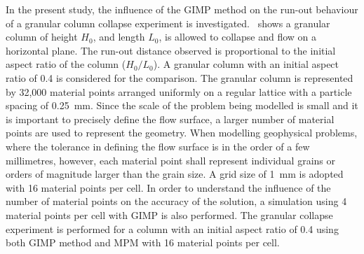 In the present study, the influence of the GIMP method on the run-out behaviour 
of a granular column collapse experiment is investigated.~ shows 
a granular column of height $H_0$, and length $L_0$, is allowed to collapse 
and flow on a horizontal plane. The run-out distance observed is proportional 
to 
the initial aspect ratio of the column ($H_0/L_0$). A granular column with an 
initial aspect ratio of 0.4 is considered for the comparison. The granular 
column is represented by 32,000 material points arranged uniformly on a regular 
lattice with a particle spacing of 0.25~\si{\mm}. Since the scale of the 
problem being modelled is small and it is important to precisely define the 
flow surface, a larger number of material points are used to represent the 
geometry. When modelling geophysical problems, where the tolerance in 
defining the flow surface is in the order of a few millimetres, however, each 
material point shall represent individual grains or orders of magnitude larger 
than the grain size. A grid size of 1~\si{mm} is adopted with 16 material 
points per cell. In order to understand the influence of the number of material 
points on the accuracy of the solution, a simulation using 4 material points 
per cell with GIMP is also performed. The granular collapse experiment is 
performed for a column with an initial aspect ratio of 0.4 using both GIMP 
method and MPM with 16 material points per cell. 

